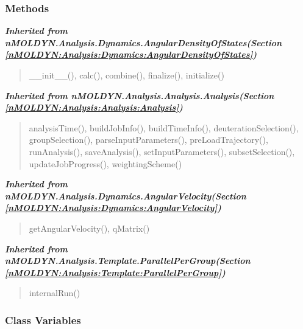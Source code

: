
  \subsubsection{Methods}


\large{\textbf{\textit{Inherited from nMOLDYN.Analysis.Dynamics.AngularDensityOfStates\textit{(Section \ref{nMOLDYN:Analysis:Dynamics:AngularDensityOfStates})}}}}

\begin{quote}
\_\_init\_\_(), calc(), combine(), finalize(), initialize()
\end{quote}

\large{\textbf{\textit{Inherited from nMOLDYN.Analysis.Analysis.Analysis\textit{(Section \ref{nMOLDYN:Analysis:Analysis:Analysis})}}}}

\begin{quote}
analysisTime(), buildJobInfo(), buildTimeInfo(), deuterationSelection(), groupSelection(), parseInputParameters(), preLoadTrajectory(), runAnalysis(), saveAnalysis(), setInputParameters(), subsetSelection(), updateJobProgress(), weightingScheme()
\end{quote}

\large{\textbf{\textit{Inherited from nMOLDYN.Analysis.Dynamics.AngularVelocity\textit{(Section \ref{nMOLDYN:Analysis:Dynamics:AngularVelocity})}}}}

\begin{quote}
getAngularVelocity(), qMatrix()
\end{quote}

\large{\textbf{\textit{Inherited from nMOLDYN.Analysis.Template.ParallelPerGroup\textit{(Section \ref{nMOLDYN:Analysis:Template:ParallelPerGroup})}}}}

\begin{quote}
internalRun()
\end{quote}


  \subsubsection{Class Variables}

